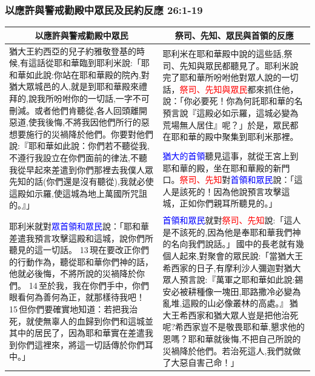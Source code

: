 \subsubsection{以應許與警戒勸殿中眾民及民約反應 26:1-19}
\begin{table}[H]
\centering
\begin{tabular}{p{8.25cm}|p{8.50cm}}\hline\hline
\multicolumn{1}{c|}{以應許與警戒勸殿中眾民}&\multicolumn{1}{c}{祭司、先知、眾民與首領的反應}\\\hline
\multirow{2}{8.35cm}{猶大王約西亞的兒子約雅敬登基的時候,有這話從耶和華臨到耶利米說:「耶和華如此說:你站在耶和華殿的院內,對猶大眾城邑的人,就是到耶和華殿來禮拜的,說我所吩咐你的一切話,一字不可刪減。或者他們肯聽從,各人回頭離開惡道,使我後悔,不將我因他們所行的惡想要施行的災禍降於他們。你要對他們說:『耶和華如此說：你們若不聽從我,不遵行我設立在你們面前的律法,不聽我從早起來差遣到你們那裡去我僕人眾先知的話(你們還是沒有聽從),我就必使這殿如示羅,使這城為地上萬國所咒詛的。』」}
&耶利米在耶和華殿中說的這些話,祭司、先知與眾民都聽見了。耶利米說完了耶和華所吩咐他對眾人說的一切話，\textcolor{red}{祭司、先知與眾民}都來抓住他，說：「你必要死！你為何託耶和華的名預言說『這殿必如示羅，這城必變為荒場無人居住』呢？」於是，眾民都在耶和華的殿中聚集到耶利米那裡。\\\cline{2-2}
&\textcolor{blue}{猶大的首領}聽見這事，就從王宮上到耶和華的殿，坐在耶和華殿的新門口。\textcolor{red}{祭司、先知}對\textcolor{blue}{首領和眾民}說：「這人是該死的！因為他說預言攻擊這城，正如你們親耳所聽見的。」\\\hline
耶利米就對\textcolor{blue}{眾首領和眾民}說：「耶和華差遣我預言攻擊這殿和這城，說你們所聽見的這一切話。 13 現在要改正你們的行動作為，聽從耶和華你們神的話，他就必後悔，不將所說的災禍降於你們。 14 至於我，我在你們手中，你們眼看何為善何為正，就那樣待我吧！ 15 但你們要確實地知道：若把我治死，就使無辜人的血歸到你們和這城並其中的居民了，因為耶和華實在差遣我到你們這裡來，將這一切話傳於你們耳中。」
&\textcolor{blue}{首領和眾民}就對\textcolor{red}{祭司、先知}說:「這人是不該死的,因為他是奉耶和華我們神的名向我們說話。」 國中的長老就有幾個人起來,對聚會的眾民說:「當猶大王希西家的日子,有摩利沙人彌迦對猶大眾人預言說:『萬軍之耶和華如此說:錫安必被耕種像一塊田,耶路撒冷必變為亂堆,這殿的山必像叢林的高處。』 猶大王希西家和猶大眾人豈是把他治死呢?希西家豈不是敬畏耶和華,懇求他的恩嗎？耶和華就後悔,不把自己所說的災禍降於他們。若治死這人,我們就做了大惡自害己命！」\\\hline

\end{tabular}
\end{table}

